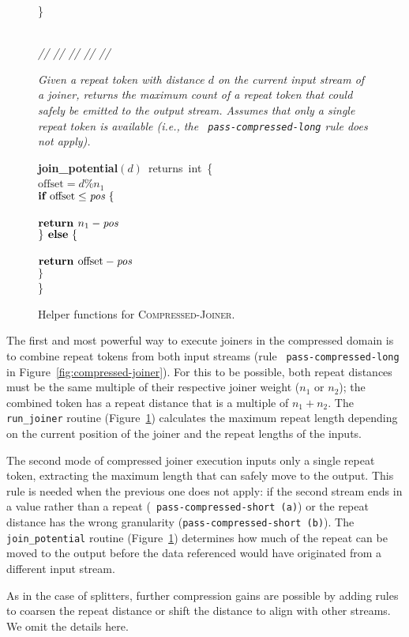 \begin{figure}[t]
\}\\
~ \\
\begin{minipage}{0.1in}
\vspace{-1.75pt}
{\it // // // // //}
\end{minipage}
\begin{minipage}{3.23in}
{\it Given a repeat token with distance $d$ on the current input
  stream of a joiner, returns the maximum count of a repeat token that
  could safely be emitted to the output stream.  Assumes that only a
  single repeat token is available (i.e., the {\tt
    pass-compressed-long} rule does not apply).}
\end{minipage}
\mbox{\bf join\_potential}$(d)$~returns~int~\{\\
\tab$\mbox{offset} = d$\%$n_1$\\
\tab$\mbox{{\bf if~}} \mbox{offset} \leq \mbox{\it pos} ~\{$\\
\tab{}\\
\tab\tab$\mbox{\bf return~} n_1 - \mbox{\it pos}$\\
\tab$\} \mbox{\bf ~else} ~\{$\\
\tab{}\\
\tab\tab$\mbox{\bf return~} \mbox{offset} - \mbox{\it pos}$\\
\tab$\}$\\
\}
\caption{Helper functions for \textsc{Compressed-Joiner}.
\protect\label{fig:helper-joiner}}
\end{figure}

The first and most powerful way to execute joiners in the compressed
domain is to combine repeat tokens from both input streams (rule {\tt
  pass-compressed-long} in Figure~\ref{fig:compressed-joiner}).  For
this to be possible, both repeat distances must be the same multiple
of their respective joiner weight ($n_1$ or $n_2$); the combined token
has a repeat distance that is a multiple of $n_1 + n_2$.  The {\tt
  run\_joiner} routine (Figure~\ref{fig:helper-joiner}) calculates the
maximum repeat length depending on the current position of the joiner
and the repeat lengths of the inputs.

The second mode of compressed joiner execution inputs only a single
repeat token, extracting the maximum length that can safely move to
the output.  This rule is needed when the previous one does not apply:
if the second stream ends in a value rather than a repeat ({\tt
  pass-compressed-short (a)}) or the repeat distance has the wrong
granularity ({\tt pass-compressed-short (b)}).  The {\tt
  join\_potential} routine (Figure~\ref{fig:helper-joiner}) determines
how much of the repeat can be moved to the output before the data
referenced would have originated from a different input stream.

As in the case of splitters, further compression gains are possible by
adding rules to coarsen the repeat distance or shift the distance to
align with other streams.  We omit the details here.
